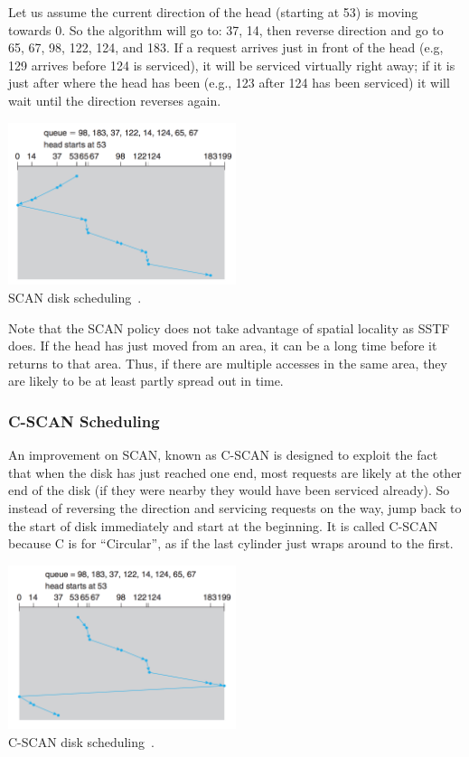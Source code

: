 Let us assume the current direction of the head (starting at 53) is moving towards 0. So the algorithm will go to: 37, 14, then reverse direction and go to 65, 67, 98, 122, 124, and 183. If a request arrives just in front of the head (e.g, 129 arrives before 124 is serviced), it will be serviced virtually right away; if it is just after where the head has been (e.g., 123 after 124 has been serviced) it will wait until the direction reverses again. 

\begin{center}
	\includegraphics[width=0.5\textwidth]{images/disk-scan.png}\\
	SCAN disk scheduling~\cite{osc}.
\end{center}

Note that the SCAN policy does not take advantage of spatial locality as SSTF does. If the head has just moved from an area, it can be a long time before it returns to that area. Thus, if there are multiple accesses in the same area, they are likely to be at least partly spread out in time.

\subsubsection*{C-SCAN Scheduling}

An improvement on SCAN, known as C-SCAN is designed to exploit the fact that when the disk has just reached one end, most requests are likely at the other end of the disk (if they were nearby they would have been serviced already). So instead of reversing the direction and servicing requests on the way, jump back to the start of disk immediately and start at the beginning. It is called C-SCAN because C is for ``Circular'', as if the last cylinder just wraps around to the first.

\begin{center}
	\includegraphics[width=0.5\textwidth]{images/disk-cscan.png}\\
	C-SCAN disk scheduling~\cite{osc}.
\end{center}

